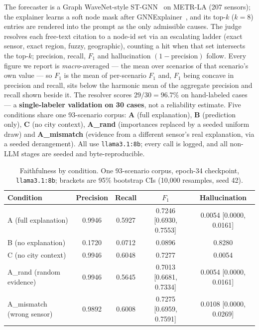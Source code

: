 \documentclass{article}
\begin{document}
The forecaster is a Graph WaveNet-style ST-GNN~\citep{gwnet2019} on METR-LA (207
sensors); the explainer learns a soft node mask after
GNNExplainer~\citep{ying2019gnnexplainer}, and its top-$k$ ($k{=}8$) entries are
rendered into the prompt as the only admissible causes. The judge resolves each
free-text citation to a node-id set via an escalating ladder (exact sensor, exact
region, fuzzy, geographic), counting a hit when that set intersects the top-$k$;
precision, recall, $F_1$ and hallucination $(1-\text{precision})$ follow. Every
figure we report is \emph{macro}-averaged --- the mean over scenarios of that
scenario's own value --- so $F_1$ is the mean of per-scenario $F_1$ and, $F_1$ being
concave in precision and recall, sits below the harmonic mean of the aggregate
precision and recall shown beside it. The resolver scores $29/30 = 96.7\%$ on hand-labeled cases --- a \textbf{single-labeler
validation on 30 cases}, not a reliability estimate. Five conditions share one
93-scenario corpus: \textbf{A} (full explanation), \textbf{B} (prediction only),
\textbf{C} (no city context), \textbf{A\_rand} (importances replaced by a seeded
uniform draw) and \textbf{A\_mismatch} (evidence from a different sensor's real
explanation, via a seeded derangement). All use \texttt{llama3.1:8b}; every call is
logged, and all non-LLM stages are seeded and byte-reproducible.

\begin{table}[t]
\centering
\caption{Faithfulness by condition. One 93-scenario corpus, epoch-34 checkpoint,
\texttt{llama3.1:8b}; brackets are 95\% bootstrap CIs (10{,}000 resamples, seed 42).}
\label{tab:main}
\small
\begin{tabular}{lcccc}
\toprule
Condition & Precision & Recall & $F_1$ & Hallucination \\
\midrule
A (full explanation)      & 0.9946 & 0.5927 & 0.7246 [0.6930, 0.7553] & 0.0054 [0.0000, 0.0161] \\
B (no explanation)        & 0.1720 & 0.0712 & 0.0896 & 0.8280 \\
C (no city context)       & 0.9946 & 0.6048 & 0.7277 & 0.0054 \\
A\_rand (random evidence) & 0.9946 & 0.5645 & 0.7013 [0.6681, 0.7334] & 0.0054 [0.0000, 0.0161] \\
A\_mismatch (wrong sensor)& 0.9892 & 0.6008 & 0.7275 [0.6959, 0.7591] & 0.0108 [0.0000, 0.0269] \\
\bottomrule
\end{tabular}
\end{table}
\end{document}
